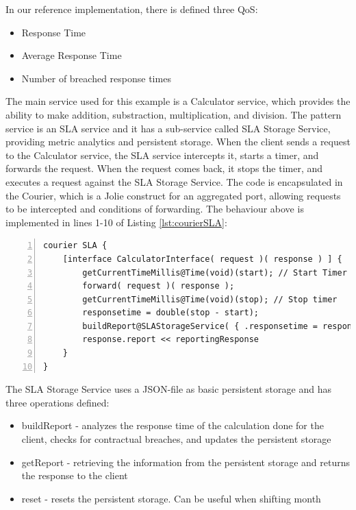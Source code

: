 \documentclass[12pt]{article}
\begin{document}
In our reference implementation, there is defined three QoS:
\begin{itemize}
    \item Response Time
    \item Average Response Time
    \item Number of breached response times
\end{itemize}

The main service used for this example is a Calculator service, which provides the ability to make addition, substraction, multiplication, and division. The pattern service is an SLA service and it has a sub-service called SLA Storage Service, providing metric analytics and persistent storage. When the client sends a request to the Calculator service, the SLA service intercepts it, starts a timer, and forwards the request. When the request comes back, it stops the timer, and executes a request against the SLA Storage Service. The code is encapsulated in the Courier, which is a Jolie construct for an aggregated port, allowing requests to be intercepted and conditions of forwarding. The behaviour above is implemented in lines 1-10 of Listing \ref{lst:courierSLA}:

\begin{lstlisting}[caption=Courier operation for the SLA service, 
captionpos=b, label={lst:courierSLA}, frame=single, breaklines=true, numbers=left, basicstyle=\scriptsize]
courier SLA {
    [interface CalculatorInterface( request )( response ) ] {
        getCurrentTimeMillis@Time(void)(start); // Start Timer
        forward( request )( response );
        getCurrentTimeMillis@Time(void)(stop); // Stop timer
        responsetime = double(stop - start);
        buildReport@SLAStorageService( { .responsetime = responsetime } )( reportingResponse );
        response.report << reportingResponse
    }
}
\end{lstlisting}

The SLA Storage Service uses a JSON-file as basic persistent storage and has three operations defined:
\begin{itemize}
    \item buildReport - analyzes the response time of the calculation done for the client, checks for contractual breaches, and updates the persistent storage
    \item getReport - retrieving the information from the persistent storage and returns the response to the client
    \item reset - resets the persistent storage. Can be useful when shifting month
\end{itemize}
\end{document}
